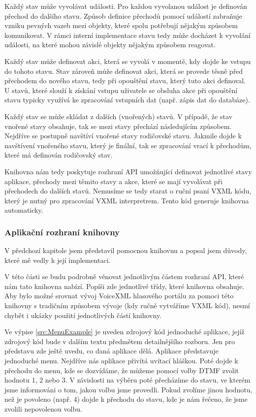 \documentclass[ing,male,java,dept460,twoside]{diploma}						%
\begin{document}
Každý stav může vyvolávat události. Pro každou vyvolanou událost je definován přechod do dalšího stavu. Způsob definice přechodů pomocí událostí zabraňuje vzniku pevných vazeb mezi objekty, které spolu potřebují nějakým způsobem komunikovat. V rámci interní implementace stavu tedy může docházet k vyvolání události, na které mohou závislé objekty nějakým způsobem reagovat.

Každý stav může definovat akci, která se vyvolá v momentě, kdy dojde ke vstupu do tohoto stavu. Stav zároveň může definovat akci, která se provede těsně před přechodem do nového stavu, tedy při opouštění stavu, který tuto akci definoval. U stavů, které slouží k získání vstupu uživatele se obsluha akce při opouštění stavu typicky využívá ke zpracování vstupních dat (např. zápis dat do databáze).

Každý stav se může skládat z dalších (vnořených) stavů. V případě, že stav vnořené stavy obsahuje, tak se mezi stavy přechází následujícím způsobem. Nejdříve se postupně navštíví vnořené stavy rodičovské stavu. Jakmile dojde k navštívení vnořeného stavu, který je finální, tak se zpracování vrací k přechodům, které má definován rodičovský stav.

Knihovna nám tedy poskytuje rozhraní API umožňující definovat jednotlivé stavy aplikace, přechody mezi těmito stavy a akce, které se mají vyvolávat při přechodech do dalších stavů. Nemusíme se tedy starat o ruční psaní VXML kódu, který je nutný pro zpracování VXML interpretrem. Tento kód generuje knihovna automaticky.

\subsubsection{Aplikační rozhraní knihovny}
V předchozí kapitole jsem představil pomocnou knihovnu a popsal jsem důvody, které mě vedly k její implementaci.

V této části se budu podrobně věnovat jednotlivým částem rozhraní API, které nám tato knihovna nabízí. Popíši zde jednotlivé třídy, které knihovna obsahuje. Aby bylo možné srovnat vývoj VoiceXML hlasového portálu za pomoci této knihovny s tradičním způsobem vývoje (kdy ručně vytváříme VXML kód), nesmí chybět i ukázky použití jednotlivých částí knihovny.

Ve výpise \ref{src:MenuExample} je uveden zdrojový kód jednoduché aplikace, jejíž zdrojový kód bude v dalším textu předmětem detailnějšího rozboru. Jen pro představu zde ještě uvedu, co daná aplikace dělá. Aplikace představuje jednoduché menu. Nejdříve nás aplikace přivítá uvítací hláškou. Poté dojde k přechodu do menu, kde se dozvídáme, že můžeme pomocí volby DTMF zvolit hodnotu 1, 2 nebo 3. V závislosti na výběru poté přecházíme do stavu, ve kterém jsme informováni o tom, jakou volbu jsme provedli. Pokud zvolíme jinou hodnotu, než je povoleno (např. 4) dojde k přechodu do stavu, kde je nám řečeno, že jsme zvolili nepovolenou volbu.
\end{document}
